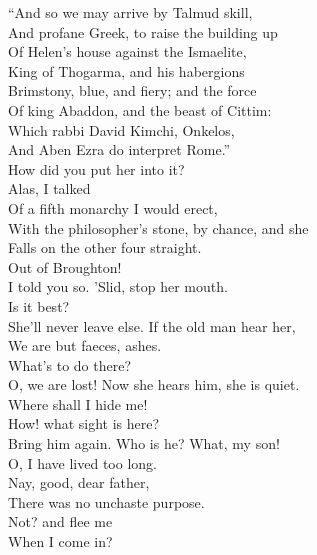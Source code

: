 \documentclass[a4paper,oneside,12pt]{memoir}
\begin{document}
\begin{drama*}
\dolspeaks ``And so we may arrive by Talmud skill,\\
And profane Greek, to raise the building up\\
Of Helen's house against the Ismaelite,\\
King of Thogarma, and his habergions\\
Brimstony, blue, and fiery; and the force\\
Of king Abaddon, and the beast of Cittim:\\
Which rabbi David Kimchi, Onkelos,\\
And Aben Ezra do interpret Rome.''\\
\facespeaks How did you put her into it?\\
\mammonspeaks {} Alas, I talked\\
Of a fifth monarchy I would erect,\\
With the philosopher's stone, by chance, and she\\
Falls on the other four straight.\\
\facespeaks {} Out of Broughton!\\
I told you so. 'Slid, stop her mouth.\\
\mammonspeaks {} Is it best?\\
\facespeaks She'll never leave else. If the old man hear her,\\
We are but faeces, ashes.\\
\subtlespeaks {}  What's to do there?\\
\facespeaks O, we are lost! Now she hears him, she is quiet.\\
\mammonspeaks Where shall I hide me!\\
\subtlespeaks {} How! what sight is here?\\
Bring him again. Who is he? What, my son!\\
O, I have lived too long.\\
\mammonspeaks {} Nay, good, dear father,\\
There was no unchaste purpose.\\
\subtlespeaks {} Not? and flee me\\
When I come in?\\

\end{drama*}
\end{document}
